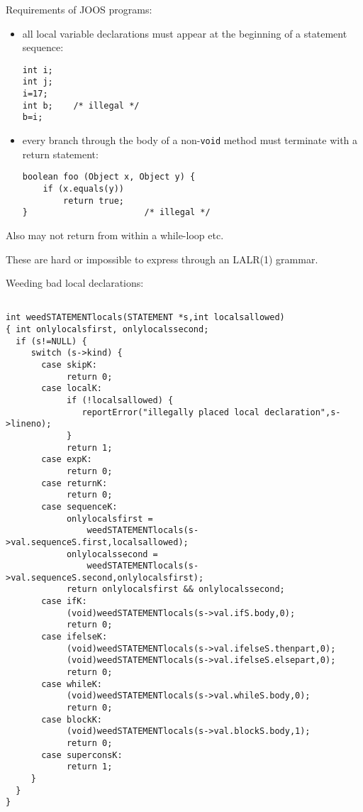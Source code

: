\begin{slide*}
Requirements of JOOS programs:

\begin{itemize}
\item all local variable declarations must appear at the beginning of a statement sequence:

\begin{scriptsize}
\begin{verbatim}
int i;
int j;
i=17;
int b;    /* illegal */
b=i;
\end{verbatim}
\end{scriptsize}
\item every branch through the body of a non-{\tt void} method must terminate with a return statement:

\begin{scriptsize}
\begin{verbatim}
boolean foo (Object x, Object y) {
    if (x.equals(y))
        return true;
}                       /* illegal */
\end{verbatim}
\end{scriptsize}
\end{itemize}

Also may not return from within a while-loop etc.

These are hard or impossible to express through an LALR(1) grammar.
\vfil
\end{slide*}
 
\begin{slide*}
Weeding bad local declarations:

\begin{tiny}
\begin{verbatim}

int weedSTATEMENTlocals(STATEMENT *s,int localsallowed)
{ int onlylocalsfirst, onlylocalssecond;
  if (s!=NULL) {
     switch (s->kind) {
       case skipK: 
            return 0;
       case localK:
            if (!localsallowed) {
               reportError("illegally placed local declaration",s->lineno);
            }
            return 1;
       case expK: 
            return 0;
       case returnK: 
            return 0;
       case sequenceK:
            onlylocalsfirst = 
                weedSTATEMENTlocals(s->val.sequenceS.first,localsallowed);
            onlylocalssecond = 
                weedSTATEMENTlocals(s->val.sequenceS.second,onlylocalsfirst);
            return onlylocalsfirst && onlylocalssecond;
       case ifK:
            (void)weedSTATEMENTlocals(s->val.ifS.body,0);
            return 0;
       case ifelseK:
            (void)weedSTATEMENTlocals(s->val.ifelseS.thenpart,0);
            (void)weedSTATEMENTlocals(s->val.ifelseS.elsepart,0);
            return 0;
       case whileK:
            (void)weedSTATEMENTlocals(s->val.whileS.body,0);
            return 0;
       case blockK:
            (void)weedSTATEMENTlocals(s->val.blockS.body,1);
            return 0;
       case superconsK:
            return 1;
     }
  }
}
\end{verbatim}
\end{tiny}

\vfil
\end{slide*}
 
